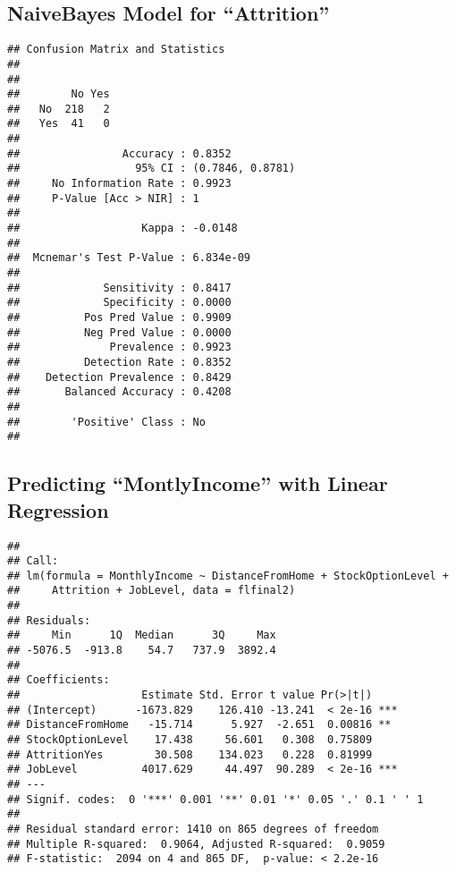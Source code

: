 \documentclass[]{article}
\begin{document}
\hypertarget{naivebayes-model-for-attrition}{%
\subsection{NaiveBayes Model for
``Attrition''}\label{naivebayes-model-for-attrition}}

\begin{verbatim}
## Confusion Matrix and Statistics
## 
##      
##        No Yes
##   No  218   2
##   Yes  41   0
##                                           
##                Accuracy : 0.8352          
##                  95% CI : (0.7846, 0.8781)
##     No Information Rate : 0.9923          
##     P-Value [Acc > NIR] : 1               
##                                           
##                   Kappa : -0.0148         
##                                           
##  Mcnemar's Test P-Value : 6.834e-09       
##                                           
##             Sensitivity : 0.8417          
##             Specificity : 0.0000          
##          Pos Pred Value : 0.9909          
##          Neg Pred Value : 0.0000          
##              Prevalence : 0.9923          
##          Detection Rate : 0.8352          
##    Detection Prevalence : 0.8429          
##       Balanced Accuracy : 0.4208          
##                                           
##        'Positive' Class : No              
## 
\end{verbatim}

\hypertarget{predicting-montlyincome-with-linear-regression}{%
\subsection{Predicting ``MontlyIncome'' with Linear
Regression}\label{predicting-montlyincome-with-linear-regression}}

\begin{verbatim}
## 
## Call:
## lm(formula = MonthlyIncome ~ DistanceFromHome + StockOptionLevel + 
##     Attrition + JobLevel, data = flfinal2)
## 
## Residuals:
##     Min      1Q  Median      3Q     Max 
## -5076.5  -913.8    54.7   737.9  3892.4 
## 
## Coefficients:
##                   Estimate Std. Error t value Pr(>|t|)    
## (Intercept)      -1673.829    126.410 -13.241  < 2e-16 ***
## DistanceFromHome   -15.714      5.927  -2.651  0.00816 ** 
## StockOptionLevel    17.438     56.601   0.308  0.75809    
## AttritionYes        30.508    134.023   0.228  0.81999    
## JobLevel          4017.629     44.497  90.289  < 2e-16 ***
## ---
## Signif. codes:  0 '***' 0.001 '**' 0.01 '*' 0.05 '.' 0.1 ' ' 1
## 
## Residual standard error: 1410 on 865 degrees of freedom
## Multiple R-squared:  0.9064, Adjusted R-squared:  0.9059 
## F-statistic:  2094 on 4 and 865 DF,  p-value: < 2.2e-16
\end{verbatim}
\end{document}
